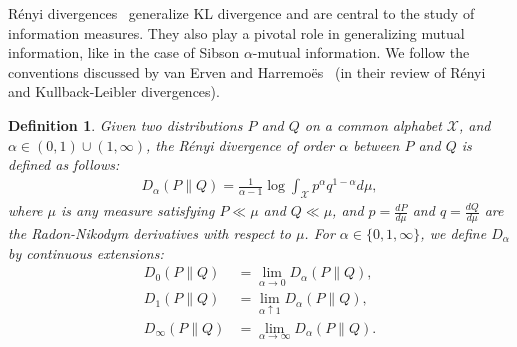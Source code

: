 \documentclass{article}
\numberwithin{theorem}{section}
\numberwithin{example}{section}
\numberwithin{remark}{section}
\newtheorem{definition}{Definition}
\numberwithin{definition}{section}
\newcommand{\X}{\mathcal{X}}
\newcommand{\ds}{\displaystyle}
\begin{document}
R\'enyi divergences~\cite{renyi:61} generalize KL divergence and are central to the study of information measures. They also play a pivotal role in generalizing mutual information, like in the case of Sibson $\alpha$-mutual information. We follow the conventions discussed by van Erven and Harremo\"es~\cite{renyiDiv} (in their review of R\'enyi and Kullback-Leibler divergences).%


\begin{definition} \label{def:renyidiv}
    Given two distributions $P$ and $Q$ on a common alphabet $\X$, and $\alpha \in (0,1) \cup (1, \infty)$, 
    the R\'enyi divergence of order $\alpha$ between $P$ and $Q$ is defined as follows:
    \begin{align} \label{eq:def-renyi}
        D_\alpha (P \| Q) = \frac{1}{\alpha-1} \log \int_{\X} p^{\alpha} q^{1-\alpha} d\mu,
    \end{align}
    where $\mu$ is any measure satisfying $P \ll \mu$ and $Q \ll \mu$,  and $\ds p = \frac{dP}{d \mu}$ and $\ds q = \frac{dQ}{d \mu}$ are the Radon-Nikodym derivatives with respect to $\mu$.  
    For $\alpha \in \{0,1,\infty\}$, we define $D_\alpha$ by continuous extensions:
    \begin{align}
        D_0 (P\| Q) & = \lim_{\alpha\rightarrow 0 } D_\alpha( P \| Q),  \\
         D_1(P\| Q) & = \lim_{\alpha\uparrow 1 } D_\alpha( P \| Q),  \\
         D_\infty( P \| Q) & = \lim_{\alpha \rightarrow \infty }D_\alpha( P \| Q). \label{eq:def-renyidiv-01inf}
    \end{align}
    \end{definition}
    
\end{document}
